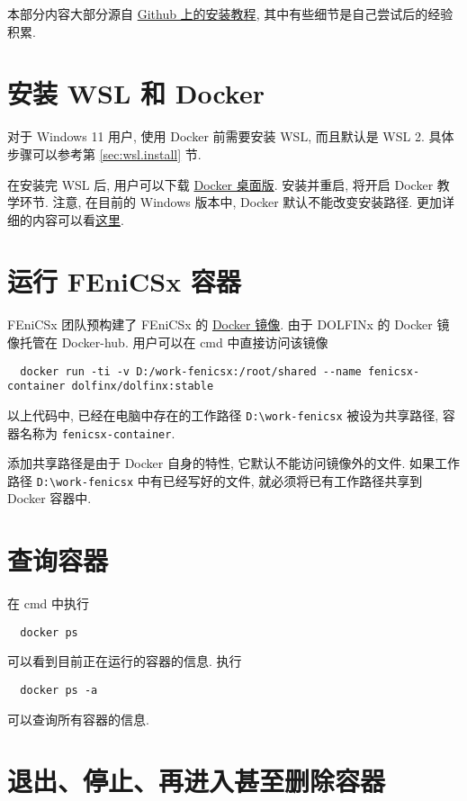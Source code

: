 \documentclass[fontset=founder]{ctexrep}
\begin{document}
本部分内容大部分源自 \href{https://github.com/FEniCS/dolfinx#docker-images}{Github 上的安装教程},
其中有些细节是自己尝试后的经验积累.

\section{安装 WSL 和 Docker}

对于 Windows 11 用户,
使用 Docker 前需要安装 WSL,
而且默认是 WSL 2.
具体步骤可以参考第 \ref{sec:wsl.install} 节.

在安装完 WSL 后,
用户可以下载 \href{https://www.docker.com/get-started}{Docker 桌面版}.
安装并重启,
将开启 Docker 教学环节.
注意,
在目前的 Windows 版本中,
Docker 默认不能改变安装路径.
更加详细的内容可以看\href{https://docs.docker.com/desktop/windows/install/}{这里}.

\section{运行 FEniCSx 容器}

FEniCSx 团队预构建了 FEniCSx 的 \href{https://hub.docker.com/u/dolfinx}{Docker 镜像}.
由于 DOLFINx 的 Docker 镜像托管在 Docker-hub.
用户可以在 \textsf{cmd} 中直接访问该镜像
\begin{lstlisting}
  docker run -ti -v D:/work-fenicsx:/root/shared --name fenicsx-container dolfinx/dolfinx:stable
\end{lstlisting}
以上代码中,
已经在电脑中存在的工作路径 \texttt{D:\textbackslash work-fenicsx} 被设为共享路径,
容器名称为 \texttt{fenicsx-container}.

添加共享路径是由于 Docker 自身的特性,
它默认不能访问镜像外的文件.
如果工作路径 \texttt{D:\textbackslash work-fenicsx} 中有已经写好的文件,
就必须将已有工作路径共享到 Docker 容器中.

\section{查询容器}

在 \textsf{cmd} 中执行
\begin{lstlisting}
  docker ps
\end{lstlisting}
可以看到目前正在运行的容器的信息.
执行
\begin{lstlisting}
  docker ps -a
\end{lstlisting}
可以查询所有容器的信息.

\section{退出、停止、再进入甚至删除容器}
\end{document}
